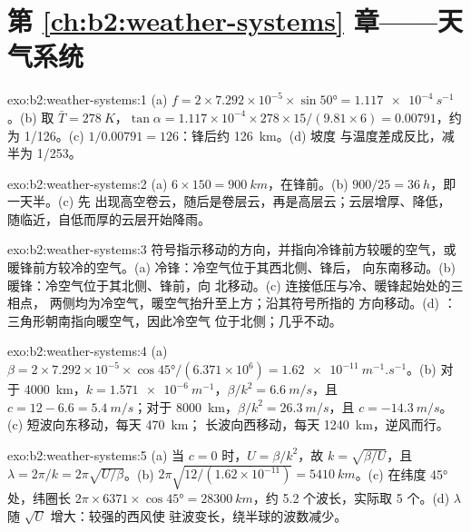 \section*{第 \ref{ch:b2:weather-systems} 章——天气系统}

\begin{solution}{exo:b2:weather-systems:1}
(a) $f = 2 \times 7.292 \times 10^{-5} \times \sin\ang{50} = \qty{1.117e-4}{s^{-1}}$。(b) 取
$\bar T = \qty{278}{K}$，$\tan\alpha = 1.117 \times 10^{-4} \times 278 \times 15/(9.81 \times 6)
= 0.00791$，约为 1/126。(c) $1/0.00791 = 126$：锋后约 \qty{126}{km}。(d) 坡度
与温度差成反比，减半为 1/253。
\end{solution}

\begin{solution}{exo:b2:weather-systems:2}
(a) $6 \times 150 = \qty{900}{km}$，在锋前。(b) $900/25 = \qty{36}{h}$，即一天半。(c) 先
出现高空卷云，随后是卷层云，再是高层云；云层增厚、降低，
随临近，自低而厚的云层开始降雨。
\end{solution}

\begin{solution}{exo:b2:weather-systems:3}
符号指示移动的方向，并指向冷锋前方较暖的空气，或
暖锋前方较冷的空气。(a) 冷锋：冷空气位于其西北侧、锋后，
向东南移动。(b) 暖锋：冷空气位于其北侧、锋前，向
北移动。(c) 连接低压与冷、暖锋起始处的三相点，
两侧均为冷空气，暖空气抬升至上方；沿其符号所指的
方向移动。(d) ：三角形朝南指向暖空气，因此冷空气
位于北侧；几乎不动。
\end{solution}

\begin{solution}{exo:b2:weather-systems:4}
(a) $\beta = 2 \times 7.292 \times 10^{-5} \times \cos\ang{45}/(6.371 \times 10^6) =
\qty{1.62e-11}{m^{-1}.s^{-1}}$。(b) 对于 \qty{4000}{km}，$k = \qty{1.571e-6}{m^{-1}}$，$\beta/k^2 =
\qty{6.6}{m/s}$，且 $c = 12 - 6.6 = \qty{5.4}{m/s}$；对于 \qty{8000}{km}，$\beta/k^2 =
\qty{26.3}{m/s}$，且 $c = \qty{-14.3}{m/s}$。(c) 短波向东移动，每天 \qty{470}{km}；
长波向西移动，每天 \qty{1240}{km}，逆风而行。
\end{solution}

\begin{solution}{exo:b2:weather-systems:5}
(a) 当 $c = 0$ 时，$U = \beta/k^2$，故 $k = \sqrt{\beta/U}$，且 $\lambda = 2\pi/k =
2\pi\sqrt{U/\beta}$。(b) $2\pi\sqrt{12/(1.62 \times 10^{-11})} = \qty{5410}{km}$。(c) 在纬度
\ang{45} 处，纬圈长 $2\pi \times 6371 \times \cos\ang{45} = \qty{28300}{km}$，约 5.2
个波长，实际取 5 个。(d) $\lambda$ 随 $\sqrt U$ 增大：较强的西风使
驻波变长，绕半球的波数减少。
\end{solution}

